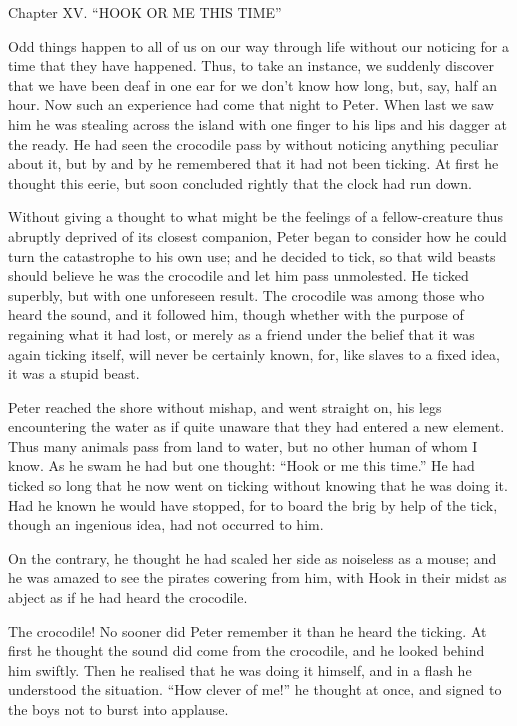 Chapter XV.
``HOOK OR ME THIS TIME''


Odd things happen to all of us on our way through life without our
noticing for a time that they have happened. Thus, to take an instance,
we suddenly discover that we have been deaf in one ear for we don't
know how long, but, say, half an hour. Now such an experience had come
that night to Peter. When last we saw him he was stealing across the
island with one finger to his lips and his dagger at the ready. He had
seen the crocodile pass by without noticing anything peculiar about it,
but by and by he remembered that it had not been ticking. At first he
thought this eerie, but soon concluded rightly that the clock had run
down.

Without giving a thought to what might be the feelings of a
fellow-creature thus abruptly deprived of its closest companion, Peter
began to consider how he could turn the catastrophe to his own use; and
he decided to tick, so that wild beasts should believe he was the
crocodile and let him pass unmolested. He ticked superbly, but with one
unforeseen result. The crocodile was among those who heard the sound,
and it followed him, though whether with the purpose of regaining what
it had lost, or merely as a friend under the belief that it was again
ticking itself, will never be certainly known, for, like slaves to a
fixed idea, it was a stupid beast.

Peter reached the shore without mishap, and went straight on, his legs
encountering the water as if quite unaware that they had entered a new
element. Thus many animals pass from land to water, but no other human
of whom I know. As he swam he had but one thought: ``Hook or me this
time.'' He had ticked so long that he now went on ticking without
knowing that he was doing it. Had he known he would have stopped, for
to board the brig by help of the tick, though an ingenious idea, had
not occurred to him.

On the contrary, he thought he had scaled her side as noiseless as a
mouse; and he was amazed to see the pirates cowering from him, with
Hook in their midst as abject as if he had heard the crocodile.

The crocodile! No sooner did Peter remember it than he heard the
ticking. At first he thought the sound did come from the crocodile, and
he looked behind him swiftly. Then he realised that he was doing it
himself, and in a flash he understood the situation. ``How clever of
me!'' he thought at once, and signed to the boys not to burst into
applause.


